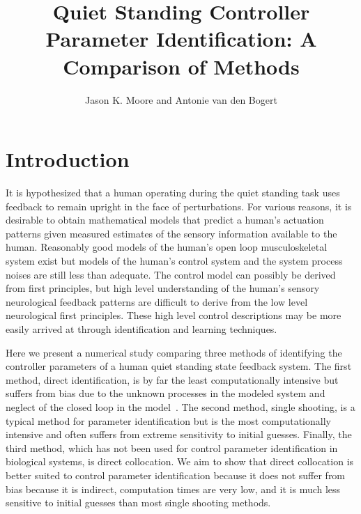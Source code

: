 \documentclass{article}
\title{Quiet Standing Controller Parameter Identification: A Comparison of
Methods}
\author{Jason K. Moore and Antonie van den Bogert}
\begin{document}
\maketitle

\section{Introduction}

It is hypothesized that a human operating during the quiet standing task uses
feedback to remain upright in the face of perturbations. For various reasons,
it is desirable to obtain mathematical models that predict a human's actuation
patterns given measured estimates of the sensory information available to the
human. Reasonably good models of the human's open loop musculoskeletal system
exist but models of the human's control system and the system process noises
are still less than adequate. The control model can possibly be derived from
first principles, but high level understanding of the human's sensory
neurological feedback patterns are difficult to derive from the low level
neurological first principles. These high level control descriptions may be
more easily arrived at through identification and learning techniques.

Here we present a numerical study comparing three methods of identifying the
controller parameters of a human quiet standing state feedback system. The
first method, direct identification, is by far the least computationally
intensive but suffers from bias due to the unknown processes in the modeled
system and neglect of the closed loop in the model~\cite{Kooij2010}. The second
method, single shooting, is a typical method for parameter identification but
is the most computationally intensive and often suffers from extreme
sensitivity to initial guesses. Finally, the third method, which has not been
used for control parameter identification in biological systems, is direct
collocation. We aim to show that direct collocation is better suited to control
parameter identification because it does not suffer from bias because it is
indirect, computation times are very low, and it is much less sensitive to
initial guesses than most single shooting methods.
\end{document}
